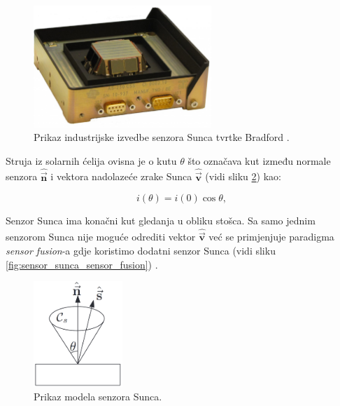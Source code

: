 \documentclass[times, utf8, diplomski, numeric]{templates/template}
\begin{document}
{{{{                \begin{figure}[htb]
                \centering
                \includegraphics[width=0.6\textwidth]{images/sensor_sunca_industrija.jpg}
                \caption{Prikaz industrijske izvedbe senzora Sunca tvrtke Bradford \cite{sunSensorBradford}.}
                \label{fig:sensor_sunca_industrija}
                \end{figure}

                Struja iz solarnih ćelija ovisna je o kutu $\theta$ što označava kut između normale senzora $\hat{\overrightarrow{\boldsymbol{n}}}$ i vektora nadolazeće zrake Sunca $\hat{\overrightarrow{\boldsymbol{v}}}$ (vidi sliku \ref{fig:sensor_sunca}) kao:

                \begin{equation}
                    i(\theta) = i(0)\cos\theta,
                \end{equation}

                Senzor Sunca ima konačni kut gledanja u obliku stošca. Sa samo jednim senzorom Sunca nije moguće odrediti vektor $\hat{\overrightarrow{\boldsymbol{v}}}$ već se primjenjuje paradigma \emph{sensor fusion}-a gdje koristimo dodatni senzor Sunca (vidi sliku \ref{fig:sensor_sunca_sensor_fusion}) \cite{adcsKnjiga}.

                \begin{figure}[htb]
                \centering
                \includegraphics[width=0.3\textwidth]{images/sensor_sunca.png}
                \caption{Prikaz modela senzora Sunca.}
                \label{fig:sensor_sunca}
                \end{figure}

}}}}
\end{document}
